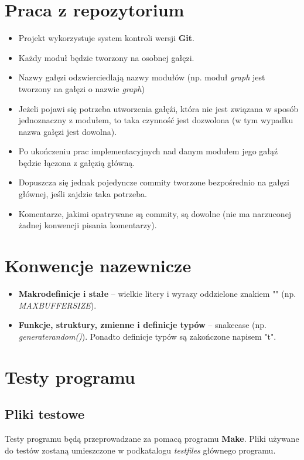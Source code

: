 \documentclass{article}
\begin{document}
\section{Praca z repozytorium}
\begin{itemize}
    \item Projekt wykorzystuje system kontroli wersji \textbf{Git}.
    \item Każdy moduł będzie tworzony na osobnej gałęzi.
    \item Nazwy gałęzi odzwierciedlają nazwy modułów (np. moduł \emph{graph} jest tworzony na gałęzi o nazwie \emph{graph})
    \item Jeżeli pojawi się potrzeba utworzenia gałęźi, która nie jest związana \linebreak w sposób jednoznaczny z modułem, to taka czynność jest dozwolona \linebreak(w tym wypadku nazwa gałęzi jest dowolna).
    \item Po ukończeniu prac implementacyjnych nad danym modułem jego gałąź będzie łączona z gałęzią główną.
    \item Dopuszcza się jednak pojedyncze commity tworzone bezpośrednio na gałęzi głównej, jeśli zajdzie taka potrzeba.
    \item Komentarze, jakimi opatrywane są commity, są dowolne (nie ma narzuconej żadnej konwencji pisania komentarzy).
\end{itemize}

\section{Konwencje nazewnicze}
\begin{itemize}
    \item \textbf{Makrodefinicje i stałe} -- wielkie litery i wyrazy oddzielone znakiem "\textunderscore" (np. \emph{MAX\textunderscore BUFFER\textunderscore SIZE}).
    \item \textbf{Funkcje, struktury, zmienne i definicje typów} -- snake\textunderscore case \linebreak (np. \emph{generate\textunderscore random()}). Ponadto definicje typów są zakończone napisem "\textunderscore t".
\end{itemize}

\newpage

\section{Testy programu}
\subsection{Pliki testowe}
Testy programu będą przeprowadzane za pomacą programu \textbf{Make}. Pliki używane do testów zostaną umieszczone w podkatalogu \emph{test\textunderscore files} głównego programu.
\end{document}
